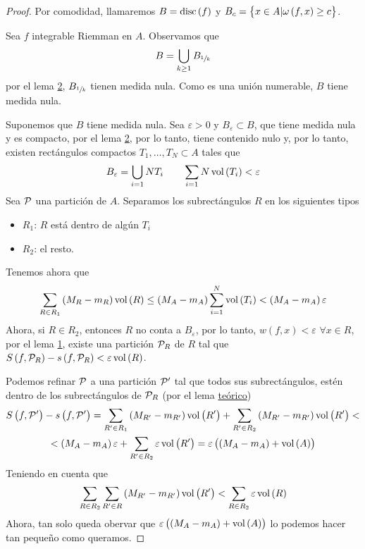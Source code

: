 \begin{proof}
	Por comodidad, llamaremos $B = \operatorname{disc}\left( f \right)$ y $B_c = \left\{x \in A
	\vert \omega\left( f, x \right) \geq c\right\}$.

	\bimplies

	Sea $f$ integrable Riemman en $A$. Observamos que
	\[
		B = \bigcup_{k \geq 1} B_{\sfrac{1}{k}}
	\]
	por el lema \hyperref[lema:dos_lebesque]{2}, $B_{\sfrac{1}{k}}$ tienen medida
	nula. Como es una unión numerable, $B$ tiene medida nula.

	\bimpliedby

	Suponemos que $B$ tiene medida nula. Sea $\varepsilon > 0$ y $B_\varepsilon
	\subset B$, que tiene medida nula y es compacto, por el lema
	\hyperref[lema:dos_lebesque]{2}, por lo tanto, tiene contenido nulo y, por lo
	tanto, existen rectángulos compactos $T_1, \dots, T_N \subset A$ tales que
	\[
		B_\varepsilon = \bigcup_{i = 1}{N} T_i \qquad
		\sum_{i=1}{N}\operatorname{vol}\left( T_i \right) < \varepsilon
	\]
	Sea $\mathcal{P}$ una partición de $A$. Separamos los subrectángulos $R$ en los
	siguientes tipos
	\begin{itemize}
		\item $R_1$: $R$ está dentro de algún $T_i$
		\item $R_2$: el resto.
	\end{itemize}

	Tenemos ahora que
	\[
		\sum_{R \in R_1}\left( M_R - m_R \right)\operatorname{vol}\left( R \right) \leq
		\left( M_A -m_A \right)\sum^{N}_{i=1} \operatorname{vol}\left( T_i \right) <
		\left( M_A - m_A \right) \varepsilon
	\]
	Ahora, si $R \in R_2$, entonces $R$ no conta a $B_\varepsilon$, por lo tanto,
	$w(f,x) < \varepsilon$ $\forall x \in R$, por el lema
	\hyperref[lema:uno_lebesque]{1}, existe una partición $\mathcal{P}_R$ de $R$ tal que
	$S\left( f, \mathcal{P}_R \right) - s\left( f, \mathcal{P}_R \right) < \varepsilon
	\operatorname{vol} \left( R \right)$.
	
	Podemos refinar $\mathcal{P}$ a una partición $\mathcal{P}^\prime$ tal que todos sus
	subrectángulos, est\'en dentro de los subrectángulos de $\mathcal{P}_R$ (por el lema
	\hyperref[lema:teo_lebesque]{teórico})
	\begin{gather*}
		S\left( f, \mathcal{P}^\prime \right) - s\left( f, \mathcal{P}^\prime \right) =
		\sum_{R^\prime \in R_1} \left( M_{R^\prime} - m_{R^\prime} \right)
		\operatorname{vol} \left( R^\prime \right) + \sum_{R^\prime \in R_2}
		\left( M_{R^\prime} - m_{R^\prime}\right) \operatorname{vol}\left( R^\prime \right)
		< \\ < \left( M_A - m_A \right)\varepsilon + \sum_{R^\prime \in R_2}
		\varepsilon \operatorname{vol}\left( R^\prime \right) = \varepsilon \left( 
		\left( M_A - m_A \right) + \operatorname{vol} \left( A \right)\right) 
	\end{gather*}
	Teniendo en cuenta que
	\[
		\sum_{R \in R_2} \sum_{R^\prime \in R} \left( M_{R^\prime} - 
		m_{R^\prime}\right) \operatorname{vol}\left( R^\prime \right) < \sum_{R \in R_2}
		\varepsilon \operatorname{vol}\left( R \right)
	\]
	Ahora, tan solo queda obervar que $\varepsilon \left( \left( M_A - m_A \right)
	+ \operatorname{vol} \left( A \right)\right)$ lo podemos hacer tan pequeño como queramos.
\end{proof}

